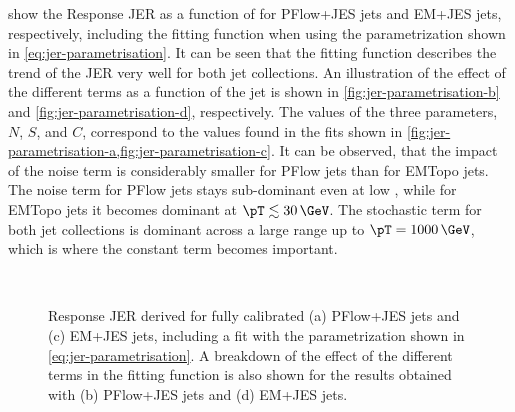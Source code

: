  show the Response JER as a function of \pTtruth for PFlow+JES jets and EM+JES jets, respectively, including the fitting function when using the parametrization shown in \cref{eq:jer-parametrisation}. It can be seen that the fitting function describes the trend of the JER very well for both jet collections.
An illustration of the effect of the different terms as a function of the jet \pT is shown in \cref{fig:jer-parametrisation-b} and \cref{fig:jer-parametrisation-d}, respectively. The values of the three parameters, $N$, $S$, and $C$, correspond to the values found in the fits shown in \cref{fig:jer-parametrisation-a,fig:jer-parametrisation-c}.
It can be observed, that the impact of the noise term is considerably smaller for PFlow jets than for EMTopo jets.
The noise term for PFlow jets stays sub-dominant even at low \pT, while for EMTopo jets it becomes dominant at $\pT \lesssim 30\,\GeV$. The stochastic term for both jet collections is dominant across a large \pT range up to $\pT = 1000\,\GeV$, which is where the constant term becomes important.



\begin{figure}[t]
     \\
    \caption[Response JER derived for fully calibrated jets.]{Response JER derived for fully calibrated (a) PFlow+JES jets and (c) EM+JES jets, including a fit with the parametrization shown in \cref{eq:jer-parametrisation}. A breakdown of the effect of the different terms in the fitting function is also shown for the results obtained with (b) PFlow+JES jets and (d) EM+JES jets.}
    \label{fig:jer-parametrisation}
\end{figure}

